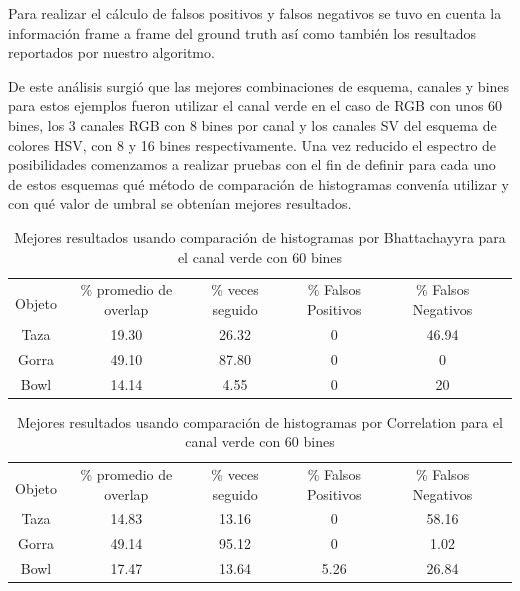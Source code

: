Para realizar el cálculo de falsos positivos y falsos negativos se tuvo en cuenta la información frame a frame del ground truth así como también los resultados reportados por nuestro algoritmo.

De este análisis surgió que las mejores combinaciones de esquema, canales y bines para estos ejemplos fueron utilizar el canal verde en el caso de RGB con unos 60 bines, los 3 canales RGB con 8 bines por canal y los canales SV del esquema de colores HSV, con 8 y 16 bines respectivamente. Una vez reducido el espectro de posibilidades comenzamos a realizar pruebas con el fin de definir para cada uno de estos esquemas qué método de comparación de histogramas convenía utilizar y con qué valor de umbral se obtenían mejores resultados.

\begin{table}[h]
	\centering
	\begin{tabular}{|c|c|c|c|c|c|}
	    \hline
	    & \multirow{2}{2.4cm}{\% promedio de overlap} & \multirow{2}{2cm}{\% veces seguido} & \multirow{2}{1.6cm}{\% Falsos Positivos} & \multirow{2}{1.6cm}{\% Falsos Negativos}\\
		Objeto & & & &\\
	    \hline
	    Taza   & 19.30      & 26.32   & 0       & 46.94 \\
	    \hline
	    Gorra  & 49.10      & 87.80   & 0       & 0     \\
	    \hline
	    Bowl   & 14.14      &  4.55   & 0       & 20    \\
	    \hline
    \end{tabular}
	\caption{Mejores resultados usando comparación de histogramas por Bhattachayyra para el canal verde con 60 bines}
	\label{pruebas_definitivas_bhatta_green}
\end{table}

\begin{table}[h]
	\centering
	\begin{tabular}{|c|c|c|c|c|c|}
	    \hline
	    & \multirow{2}{2.4cm}{\% promedio de overlap} & \multirow{2}{2cm}{\% veces seguido} & \multirow{2}{1.6cm}{\% Falsos Positivos} & \multirow{2}{1.6cm}{\% Falsos Negativos}\\
		Objeto & & & &\\
	    \hline
	    Taza   & 14.83      & 13.16     & 0      & 58.16 \\
	    \hline
	    Gorra  & 49.14      & 95.12     & 0      & 1.02  \\
	    \hline
	    Bowl   & 17.47      & 13.64     & 5.26   & 26.84 \\
	    \hline
    \end{tabular}
	\caption{Mejores resultados usando comparación de histogramas por Correlation para el canal verde con 60 bines}
	\label{pruebas_definitivas_correl_green}
\end{table}

